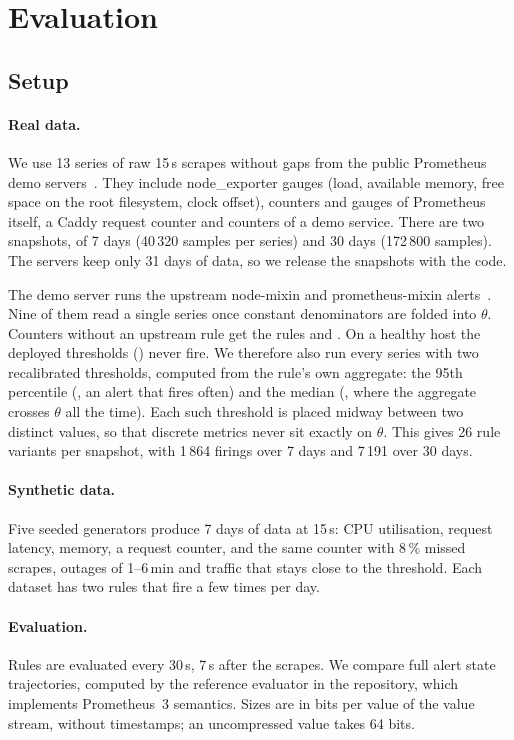 \section{Evaluation}
\label{sec:eval}

\subsection{Setup}

\paragraph{Real data.} We use 13 series of raw 15\,s scrapes without gaps
from the public Prometheus demo servers~\cite{promdemo}. They include
node\_exporter gauges (load, available memory, free space on the root
filesystem, clock offset), counters and gauges of Prometheus itself, a
Caddy request counter and counters of a demo service. There are two
snapshots, of 7 days (40\,320 samples per series) and 30 days (172\,800
samples). The servers keep only 31 days of data, so we release the
snapshots with the code.

The demo server runs the upstream node-mixin and prometheus-mixin
alerts~\cite{nodemixin}. Nine of them read a single series once constant
denominators are folded into $\theta$. Counters without an upstream rule
get the rules  and
. On a healthy host the deployed
thresholds () never fire. We therefore also run every series
with two recalibrated thresholds, computed from the rule's own aggregate:
the 95th percentile (, an alert that fires often) and the median
(, where the aggregate crosses $\theta$ all the time). Each such
threshold is placed midway between two distinct values, so that discrete
metrics never sit exactly on $\theta$. This gives 26 rule variants per
snapshot, with 1\,864 firings over 7 days and 7\,191 over 30 days.

\paragraph{Synthetic data.} Five seeded generators produce 7 days of
data at 15\,s: CPU utilisation, request latency, memory, a request
counter, and the same counter with 8\,\% missed scrapes, outages of
1--6\,min and traffic that stays close to the threshold. Each dataset has
two rules that fire a few times per day.

\paragraph{Evaluation.} Rules are evaluated every 30\,s, 7\,s after the
scrapes. We compare full alert state trajectories, computed by the
reference evaluator in the repository, which implements Prometheus~3
semantics. Sizes are in bits per value of the value stream, without
timestamps; an uncompressed value takes 64 bits.

